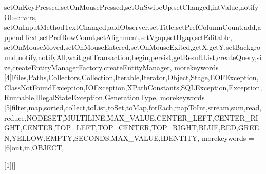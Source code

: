 {{    setOnKeyPressed,setOnMousePressed,setOnSwipeUp,setChanged,intValue,notifyObservers, setOnInputMethodTextChanged,addObserver,setTitle,setPrefColumnCount,add,appendText,setPrefRowCount,setAlignment,setVgap,setHgap,setEditable,%
    setOnMouseMoved,setOnMouseEntered,setOnMouseExited,getX,getY,setBackground,notify,notifyAll,wait,getTransaction,begin,persist,getResultList,createQuery,size,createEntityManagerFactory,createEntityManager},
    morekeywords = [4]{Files,Paths,Collectors,Collection,Iterable,Iterator,Object,Stage,EOFException,ClassNotFoundException,IOException,XPathConstants,SQLException,Exception,Runnable,IllegalStateException,GenerationType},
    morekeywords = [5]{filter,map,sorted,collect,toList,toSet,toMap,forEach,mapToInt,stream,sum,read,reduce,NODESET,MULTILINE,MAX_VALUE,CENTER_LEFT,CENTER_RIGHT,CENTER,TOP_LEFT,TOP_CENTER,TOP_RIGHT,BLUE,RED,GREEN,YELLOW,EMPTY,SECONDS,MAX_VALUE,IDENTITY},
    morekeywords = [6]{out,in,OBJECT},
}


[1][]
  {\lstset{language=lJava,#1}}
{}



